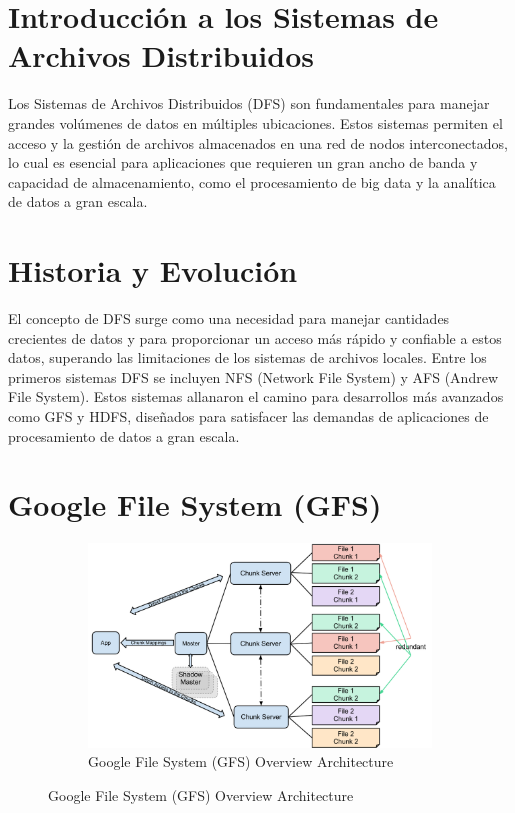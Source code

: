 \section{Introducción a los Sistemas de Archivos Distribuidos}

Los Sistemas de Archivos Distribuidos (DFS) son fundamentales para manejar grandes volúmenes de datos en múltiples ubicaciones. Estos sistemas permiten el acceso y la gestión de archivos almacenados en una red de nodos interconectados, lo cual es esencial para aplicaciones que requieren un gran ancho de banda y capacidad de almacenamiento, como el procesamiento de big data y la analítica de datos a gran escala.

\section{Historia y Evolución}

El concepto de DFS surge como una necesidad para manejar cantidades crecientes de datos y para proporcionar un acceso más rápido y confiable a estos datos, superando las limitaciones de los sistemas de archivos locales. Entre los primeros sistemas DFS se incluyen NFS (Network File System) y AFS (Andrew File System). Estos sistemas allanaron el camino para desarrollos más avanzados como GFS y HDFS, diseñados para satisfacer las demandas de aplicaciones de procesamiento de datos a gran escala.

\section{Google File System (GFS)}

\begin{figure}[H]
    \centering
    \begin{subfigure}[b]{0.8\textwidth}
        \centering
        \includegraphics[width=\textwidth]{Figures/1. Content/GoogleFileSystemGFS.png}
        \caption{Google File System (GFS) Overview Architecture}
        \label{fig: GFSArchitecture}
    \end{subfigure}
    \hfill
\end{figure}

